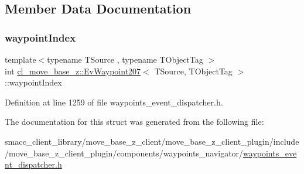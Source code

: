 \subsection{Member Data Documentation}
\mbox{\label{structcl__move__base__z_1_1EvWaypoint207_a5b2aaf2203b50e6524d48a271b681337}} 
\subsubsection{\texorpdfstring{waypoint\+Index}{waypointIndex}}
{\footnotesize\ttfamily template$<$typename T\+Source , typename T\+Object\+Tag $>$ \\
int \hyperlink{structcl__move__base__z_1_1EvWaypoint207}{cl\+\_\+move\+\_\+base\+\_\+z\+::\+Ev\+Waypoint207}$<$ T\+Source, T\+Object\+Tag $>$\+::waypoint\+Index}



Definition at line 1259 of file waypoints\+\_\+event\+\_\+dispatcher.\+h.



The documentation for this struct was generated from the following file\+:\begin{DoxyCompactItemize}
\item 
smacc\+\_\+client\+\_\+library/move\+\_\+base\+\_\+z\+\_\+client/move\+\_\+base\+\_\+z\+\_\+client\+\_\+plugin/include/move\+\_\+base\+\_\+z\+\_\+client\+\_\+plugin/components/waypoints\+\_\+navigator/\hyperlink{waypoints__event__dispatcher_8h}{waypoints\+\_\+event\+\_\+dispatcher.\+h}\end{DoxyCompactItemize}

